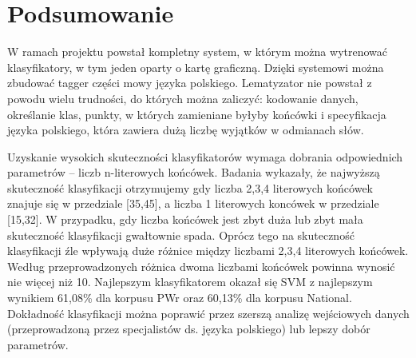 \section{Podsumowanie}

W ramach projektu powstał kompletny system, w którym można wytrenować klasyfikatory, w tym jeden oparty o kartę graficzną. Dzięki systemowi można zbudować tagger części mowy języka polskiego. Lematyzator nie powstał z powodu wielu trudności, do których można zaliczyć: kodowanie danych, określanie klas, punkty, w których zamieniane byłyby końcówki i specyfikacja języka polskiego, która zawiera dużą liczbę wyjątków w odmianach słów.

Uzyskanie wysokich skuteczności klasyfikatorów wymaga dobrania odpowiednich parametrów -- liczb n-literowych końcówek. Badania wykazały, że najwyższą skuteczność klasyfikacji otrzymujemy gdy liczba 2,3,4 literowych końcówek znajuje się w przedziale [35,45], a liczba 1 literowych koncówek w przedziale [15,32]. W przypadku, gdy liczba końcówek jest zbyt duża lub zbyt mała skuteczność klasyfikacji gwałtownie spada. Oprócz tego na skuteczność klasyfikacji źle wpływają duże różnice między liczbami 2,3,4 literowych końcówek. Według przeprowadzonych różnica dwoma liczbami końcówek powinna wynosić nie więcej niż 10. Najlepszym klasyfikatorem okazał się SVM z najlepszym wynikiem 61,08\% dla korpusu PWr oraz 60,13\% dla korpusu National. Dokładność klasyfikacji można poprawić przez szerszą analizę wejściowych danych (przeprowadzoną przez specjalistów ds. języka polskiego) lub lepszy dobór parametrów.  

